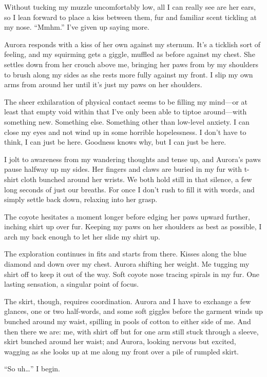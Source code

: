 Without tucking my muzzle uncomfortably low, all I can really see are her ears, so I lean forward to place a kiss between them, fur and familiar scent tickling at my nose. ``Mmhm.'' I've given up saying more.

Aurora responds with a kiss of her own against my sternum. It's a ticklish sort of feeling, and my squirming gets a giggle, muffled as before against my chest. She settles down from her crouch above me, bringing her paws from by my shoulders to brush along my sides as she rests more fully against my front. I slip my own arms from around her until it's just my paws on her shoulders.

The sheer exhilaration of physical contact seems to be filling my mind---or at least that empty void within that I've only been able to tiptoe around---with something new. Something else. Something other than low-level anxiety. I can close my eyes and not wind up in some horrible hopelessness. I don't have to think, I can just be here. Goodness knows why, but I can just be here.

I jolt to awareness from my wandering thoughts and tense up, and Aurora's paws pause halfway up my sides. Her fingers and claws are buried in my fur with t-shirt cloth bunched around her wrists. We both hold still in that silence, a few long seconds of just our breaths. For once I don't rush to fill it with words, and simply settle back down, relaxing into her grasp.

The coyote hesitates a moment longer before edging her paws upward further, inching shirt up over fur. Keeping my paws on her shoulders as best as possible, I arch my back enough to let her slide my shirt up.

The exploration continues in fits and starts from there. Kisses along the blue diamond and down over my chest. Aurora shifting her weight. Me tugging my shirt off to keep it out of the way. Soft coyote nose tracing spirals in my fur. One lasting sensation, a singular point of focus.

The skirt, though, requires coordination. Aurora and I have to exchange a few glances, one or two half-words, and some soft giggles before the garment winds up bunched around my waist, spilling in pools of cotton to either side of me. And then there we are: me, with shirt off but for one arm still stuck through a sleeve, skirt bunched around her waist; and Aurora, looking nervous but excited, wagging as she looks up at me along my front over a pile of rumpled skirt.

``So uh\ldots{}'' I begin.

